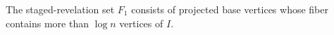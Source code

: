 \begin{definition}
The staged-revelation set \(F_1\) consists of projected base vertices whose
fiber contains more than \(\log n\) vertices of \(I\).
\end{definition}
